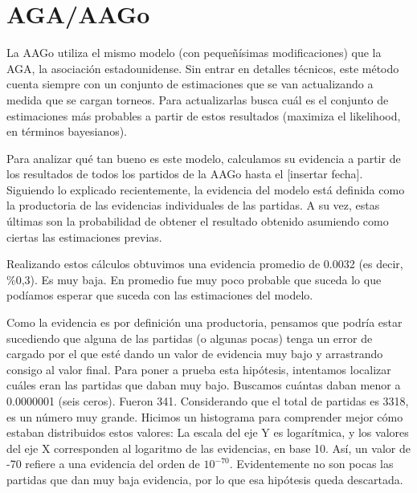 \documentclass[a4paper,10pt]{report}
\begin{document}
\section*{AGA/AAGo}

La AAGo utiliza el mismo modelo (con pequeñísimas modificaciones) que la AGA, la asociación estadounidense.
Sin entrar en detalles técnicos, este método cuenta siempre con un conjunto de estimaciones que se van actualizando a medida que se cargan torneos.
Para actualizarlas busca cuál es el conjunto de estimaciones más probables a partir de estos resultados (maximiza el likelihood, en términos bayesianos).

Para analizar qué tan bueno es este modelo, calculamos su evidencia a partir de los resultados de todos los partidos de la AAGo hasta el [insertar fecha].
Siguiendo lo explicado recientemente, la evidencia del modelo está definida como la productoria de las evidencias individuales de las partidas.
A su vez, estas últimas son la probabilidad de obtener el resultado obtenido asumiendo como ciertas las estimaciones previas. %

Realizando estos cálculos obtuvimos una evidencia promedio de 0.0032 (es decir, \%0,3).
Es muy baja.
En promedio fue muy poco probable que suceda lo que podíamos esperar que suceda con las estimaciones del modelo.

Como la evidencia es por definición una productoria, pensamos que podría estar sucediendo que alguna de las partidas (o algunas pocas) tenga un error de cargado por el que esté dando un valor de evidencia muy bajo y arrastrando consigo al valor final.
Para poner a prueba esta hipótesis, intentamos localizar cuáles eran las partidas que daban muy bajo.
Buscamos cuántas daban menor a 0.0000001 (seis ceros).
Fueron 341.
Considerando que el total de partidas es 3318, es un número muy grande.
Hicimos un histograma para comprender mejor cómo estaban distribuidos estos valores:
La escala del eje Y es logarítmica, y los valores del eje X corresponden al logaritmo de las evidencias, en base 10. Así, un valor de -70 refiere a una evidencia del orden de $10^{-70}$.
Evidentemente no son pocas las partidas que dan muy baja evidencia, por lo que esa hipótesis queda descartada.
\end{document}
